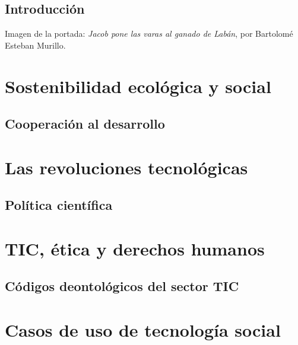 \documentclass[a4paper]{book}
\numberwithin{figure}{chapter}
\numberwithin{equation}{chapter}
\begin{document}
\newpage


\section*{Introducción}
Imagen de la portada: \textsl{Jacob pone las varas al ganado de Labán}, por Bartolomé Esteban Murillo.


\newpage

\setlength{\parskip}{0em}
\tableofcontents 
\setlength{\parskip}{0.5em}

\chapter{Sostenibilidad ecológica y social}
\section{Cooperación al desarrollo}

\chapter{Las revoluciones tecnológicas}
\section{Política científica}

\chapter{TIC, ética y derechos humanos}
\section{Códigos deontológicos del sector TIC}

\chapter{Casos de uso de tecnología social}

% 
\end{document}
